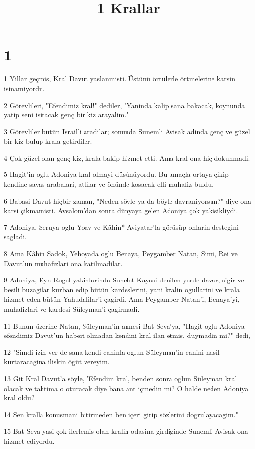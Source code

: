 

\title{1 Krallar}


\chapter{1}

\par 1 Yillar geçmis, Kral Davut yaslanmisti. Üstünü örtülerle örtmelerine karsin isinamiyordu.
\par 2 Görevlileri, "Efendimiz kral!" dediler, "Yaninda kalip sana bakacak, koynunda yatip seni isitacak genç bir kiz arayalim."
\par 3 Görevliler bütün Israil'i aradilar; sonunda Sunemli Avisak adinda genç ve güzel bir kiz bulup krala getirdiler.
\par 4 Çok güzel olan genç kiz, krala bakip hizmet etti. Ama kral ona hiç dokunmadi.
\par 5 Hagit'in oglu Adoniya kral olmayi düsünüyordu. Bu amaçla ortaya çikip kendine savas arabalari, atlilar ve önünde kosacak elli muhafiz buldu.
\par 6 Babasi Davut hiçbir zaman, "Neden söyle ya da böyle davraniyorsun?" diye ona karsi çikmamisti. Avsalom'dan sonra dünyaya gelen Adoniya çok yakisikliydi.
\par 7 Adoniya, Seruya oglu Yoav ve Kâhin* Aviyatar'la görüsüp onlarin destegini sagladi.
\par 8 Ama Kâhin Sadok, Yehoyada oglu Benaya, Peygamber Natan, Simi, Rei ve Davut'un muhafizlari ona katilmadilar.
\par 9 Adoniya, Eyn-Rogel yakinlarinda Sohelet Kayasi denilen yerde davar, sigir ve besili buzagilar kurban edip bütün kardeslerini, yani kralin ogullarini ve krala hizmet eden bütün Yahudalilar'i çagirdi. Ama Peygamber Natan'i, Benaya'yi, muhafizlari ve kardesi Süleyman'i çagirmadi.
\par 11 Bunun üzerine Natan, Süleyman'in annesi Bat-Seva'ya, "Hagit oglu Adoniya efendimiz Davut'un haberi olmadan kendini kral ilan etmis, duymadin mi?" dedi,
\par 12 "Simdi izin ver de sana kendi caninla oglun Süleyman'in canini nasil kurtaracagina iliskin ögüt vereyim.
\par 13 Git Kral Davut'a söyle, 'Efendim kral, benden sonra oglun Süleyman kral olacak ve tahtima o oturacak diye bana ant içmedin mi? O halde neden Adoniya kral oldu?
\par 14 Sen kralla konusmani bitirmeden ben içeri girip sözlerini dogrulayacagim."
\par 15 Bat-Seva yasi çok ilerlemis olan kralin odasina girdiginde Sunemli Avisak ona hizmet ediyordu.

